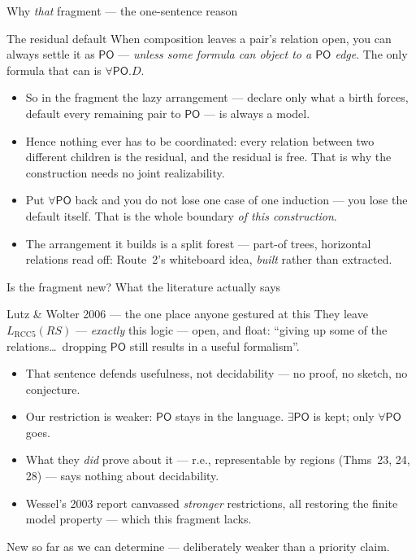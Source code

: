 \documentclass[aspectratio=169,11pt]{beamer}
\newcommand{\PO}{\mathsf{PO}}
\begin{document}
\begin{frame}{Why \emph{that} fragment --- the one-sentence reason}
\begin{block}{The residual default}
  When composition leaves a pair's relation open, you can always settle it
  as \alert{$\PO$} --- \emph{unless some formula can object to a $\PO$
  edge}. The only formula that can is $\forall\PO.D$.
\end{block}
\vfill
\begin{itemize}
  \item So in the fragment the \alert{lazy arrangement} --- declare only what
        a birth forces, default every remaining pair to $\PO$ --- is
        \alert{always} a model.
  \item Hence \alert{nothing ever has to be coordinated}: every relation
        between two different children is the residual, and the residual is
        free. That is why the construction needs no joint realizability.
  \item Put $\forall\PO$ back and you do not lose one case of one induction
        --- you lose \alert{the default itself}. That is the whole boundary
        \emph{of this construction}.
  \item The arrangement it builds is a \alert{split forest} --- part-of trees,
        horizontal relations read off: Route~2's whiteboard idea,
        \emph{built} rather than extracted.
\end{itemize}
\end{frame}

\begin{frame}{Is the fragment new? What the literature actually says}
\begin{block}{Lutz \& Wolter 2006 --- the one place anyone gestured at this}
  They leave $L_{\mathrm{RCC5}}(\mathit{RS})$ --- \emph{exactly} this logic ---
  \alert{open}, and float: ``giving up some of the relations\dots\ dropping
  $\PO$ still results in a useful formalism''.
\end{block}
\begin{itemize}
  \item That sentence defends \alert{usefulness}, not decidability ---
        no proof, no sketch, no conjecture.
  \item Our restriction is \alert{weaker}: $\PO$ stays in the language.
        $\exists\PO$ is kept; only $\forall\PO$ goes.
  \item What they \emph{did} prove about it --- r.e., representable by
        regions (Thms~23, 24, 28) --- says nothing about decidability.
  \item Wessel's 2003 report canvassed \emph{stronger} restrictions, all
        restoring the \alert{finite model property} --- which this fragment lacks.
\end{itemize}
\vfill
\begin{center}
New \alert{so far as we can determine} --- deliberately weaker than a
priority claim.
\end{center}
\end{frame}
\end{document}
